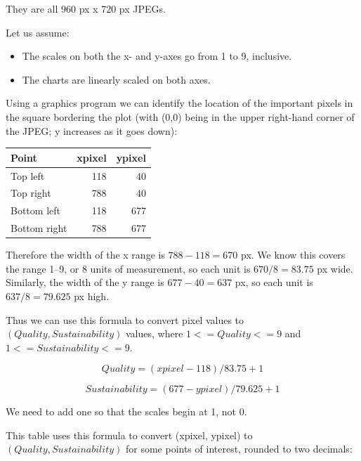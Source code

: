 \documentclass[article,10pt,microtype]{article}
\begin{document}
They are all 960 px x 720 px JPEGs.

Let us assume:

\begin{itemize}
\item The scales on both the x- and y-axes go from 1 to 9, inclusive.
\item The charts are linearly scaled on both axes.
\end{itemize}

Using a graphics program we can identify the location of the important pixels in the square bordering the plot (with (0,0) being in the upper right-hand corner of the JPEG; y increases as it goes down):

\begin{center}
\begin{tabular}{lrr}
Point & xpixel & ypixel\\
\hline
Top left & 118 & 40\\
Top right & 788 & 40\\
Bottom left & 118 & 677\\
Bottom right & 788 & 677\\
\end{tabular}
\end{center}

Therefore the width of the x range is \(788 - 118 = 670\) px.  We know this covers the range 1--9, or 8 units of measurement, so each unit is \( 670 / 8 = 83.75\) px wide.  Similarly, the width of the y range is \(677 - 40 = 637\) px, so each unit is \(637 / 8 = 79.625 \) px high.

Thus we can use this formula to convert pixel values to \((Quality, Sustainability)\) values, where \( 1 <= Quality <= 9\) and \(1 <= Sustainability <= 9\).

\begin{equation}
Quality = (xpixel - 118)/83.75 + 1
\end{equation}

\begin{equation}
Sustainability = (677 - ypixel)/79.625 + 1
\end{equation}

We need to add one so that the scales begin at 1, not 0.

This table uses this formula to convert (xpixel, ypixel) to \((Quality, Sustainability)\) for some points of interest, rounded to two decimals:
\end{document}
